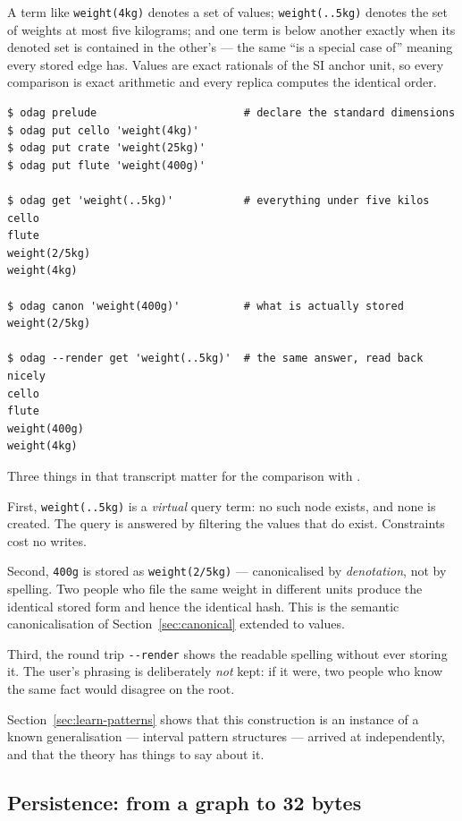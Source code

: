 A term like \verb|weight(4kg)| denotes a set of values; \verb|weight(..5kg)|
denotes the set of weights at most five kilograms; and one term is below
another exactly when its denoted set is contained in the other's --- the same
``is a special case of'' meaning every stored edge has. Values are exact
rationals of the SI anchor unit, so every comparison is exact arithmetic and
every replica computes the identical order.

\begin{lstlisting}
$ odag prelude                       # declare the standard dimensions
$ odag put cello 'weight(4kg)'
$ odag put crate 'weight(25kg)'
$ odag put flute 'weight(400g)'

$ odag get 'weight(..5kg)'           # everything under five kilos
cello
flute
weight(2/5kg)
weight(4kg)

$ odag canon 'weight(400g)'          # what is actually stored
weight(2/5kg)

$ odag --render get 'weight(..5kg)'  # the same answer, read back nicely
cello
flute
weight(400g)
weight(4kg)
\end{lstlisting}

Three things in that transcript matter for the comparison with \fca{}.

First, \verb|weight(..5kg)| is a \emph{virtual} query term: no such node
exists, and none is created. The query is answered by filtering the values
that do exist. Constraints cost no writes.

Second, \verb|400g| is stored as \verb|weight(2/5kg)| --- canonicalised by
\emph{denotation}, not by spelling. Two people who file the same weight in
different units produce the identical stored form and hence the identical
hash. This is the semantic canonicalisation of Section~\ref{sec:canonical}
extended to values.

Third, the round trip \verb|--render| shows the readable spelling without ever
storing it. The user's phrasing is deliberately \emph{not} kept: if it were,
two people who know the same fact would disagree on the root.

\begin{remark}
Section~\ref{sec:learn-patterns} shows that this construction is an instance
of a known \fca{} generalisation --- interval pattern structures
\citep{ganter2001,kaytoue2011} --- arrived at independently, and that the
theory has things to say about it.
\end{remark}

\subsection{Persistence: from a graph to 32 bytes}
\label{sec:persistence}

